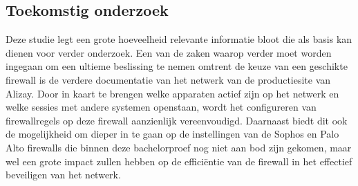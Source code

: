 \documentclass[a0,portrait]{hogent-poster}
\begin{document}
\begin{multicols}{2}
\section{Toekomstig onderzoek}

Deze studie legt een grote hoeveelheid relevante informatie bloot die als basis kan dienen voor verder onderzoek. Een van de zaken waarop verder moet worden ingegaan om een ultieme beslissing te nemen omtrent de keuze van een geschikte firewall is de verdere documentatie van het netwerk van de productiesite van Alizay. 
Door in kaart te brengen welke apparaten actief zijn op het netwerk en welke sessies met andere systemen openstaan, wordt het configureren van firewallregels op deze firewall aanzienlijk vereenvoudigd. Daarnaast biedt dit ook de mogelijkheid om dieper in te gaan op de instellingen van de Sophos en Palo Alto firewalls die binnen deze bachelorproef nog niet aan bod zijn gekomen, maar wel een grote impact zullen hebben op de efficiëntie van de firewall in het effectief beveiligen van het netwerk.

 
\end{multicols}
\end{document}
